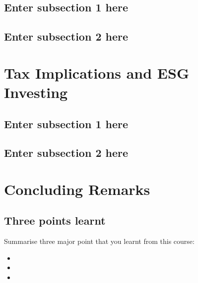 \documentclass[
]{book}
\providecommand{\tightlist}{%
  \setlength{\itemsep}{0pt}\setlength{\parskip}{0pt}}
\begin{document}
\hypertarget{enter-subsection-1-here-4}{%
\section{Enter subsection 1 here}\label{enter-subsection-1-here-4}}

\hypertarget{enter-subsection-2-here-4}{%
\section{Enter subsection 2 here}\label{enter-subsection-2-here-4}}

\hypertarget{ch9}{%
\chapter{Tax Implications and ESG Investing}\label{ch9}}

\hypertarget{enter-subsection-1-here-5}{%
\section{Enter subsection 1 here}\label{enter-subsection-1-here-5}}

\hypertarget{enter-subsection-2-here-5}{%
\section{Enter subsection 2 here}\label{enter-subsection-2-here-5}}

\hypertarget{concluding-remarks}{%
\chapter*{Concluding Remarks}\label{concluding-remarks}}

\hypertarget{three-points-learnt}{%
\section*{Three points learnt}\label{three-points-learnt}}

Summarise three major point that you learnt from this course:

\begin{itemize}
\tightlist
\item
\item
\item
\end{itemize}
\end{document}
